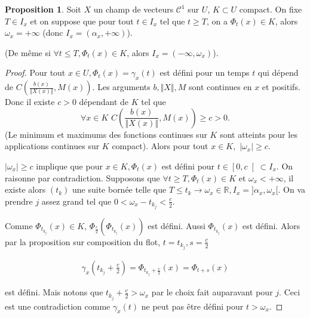 \documentclass[french]{article}
\theoremstyle{definition}
\newtheorem{protoproposition}{Proposition}[section]
\newenvironment{prop}
    {\colorlet{shadecolor}{blue!5}\begin{shaded}\begin{protoproposition}}
    {\end{protoproposition}\end{shaded}}
\newcommand{\lesss}{<}
\newcommand{\less}{\lesss}
\newcommand{\biggg}{>}
\newcommand{\bg}{\biggg}
\begin{document}
\begin{prop}
  Soit \(X\) un champ de vecteurs \(\mathcal{C}^1\) sur \(U\), \(K \subset U\) compact. On fixe \(T \in I_x\) et on suppose que pour tout \(t \in I_x\) tel que \(t \geq  T\), on a \(\Phi_t(x) \in K\), alors \(\omega_x = +\infty\) (donc \(I_x = (\alpha_x,+\infty)\)).

  (De même si \(\forall t \leq  T, \Phi_t(x) \in K\), alors \(I_x = (-\infty,\omega_x)\)).
\end{prop}

\begin{proof}
  Pour tout \(x \in U, \Phi_t(x) = \gamma_x(t)\) est défini pour un temps \(t\) qui  dépend de \(C\left(\frac{b(x)}{\left\Vert X(x) \right\Vert }, M(x)\right)\). Les arguments $b, \Vert X \Vert, M$ sont continues en \(x\) et positifs. Donc il existe \(c \bg 0\) dépendant de \(K\) tel que
   \[\forall x \in K\, \,C \left(\frac{b(x)}{\left\Vert X(x) \right\Vert }, M(x)\right) \geq c \bg 0.\]
  (Le minimum et maximums des fonctions continues  sur \(K\) sont atteints pour  les applications continues sur \(K\) compact). Alors pour tout \(x\in K,\,\, |\omega_x| \ge c\).

  \( |\omega_x| \ge c\) implique que pour \(x \in K, \Phi_t(x)\) est défini pour \(t \in \left[0, c\right[ \subset I_x\). On raisonne par contradiction. Supposons que \(\forall t \geq T, \Phi_t(x) \in K\) et \(\omega_x \less +\infty\), il existe alors \((t_k)\) une suite bornée telle que  \(T \le t_k \longrightarrow \omega_x \in \mathbb{R}, I_x = ]\alpha_x, \omega_x[\). On va prendre \(j\) assez grand tel que \(0   \less \omega_x - t _{k_j} \less  \frac c2 \).

Comme \(\Phi _{t _{k_j}}(x) \in K\), \(\Phi _{\frac c2}(\Phi _{t _{k_j}}(x))\) est défini. Aussi  \(\Phi _{t _{k_j}}(x)\) est défini. Alors par la  proposition sur composition du flot,  $t=  t_{k_j}, s=  \displaystyle \frac c2$

  \begin{gather*}
   \gamma_{x} (t_{k_j}  + \frac c2) = \Phi _{t_{k_j}  + \frac c2} (x) = \Phi _{t+s} (x)     \end{gather*}

  est défini.  Mais notons que $t_{k_j} + \frac c2 > \omega_x$ par le choix fait auparavant pour $j$. Ceci est une contradiction comme $\gamma_x(t)$ ne peut pas \^etre d\'efini pour $t>\omega_x$.
\end{proof}
\end{document}
